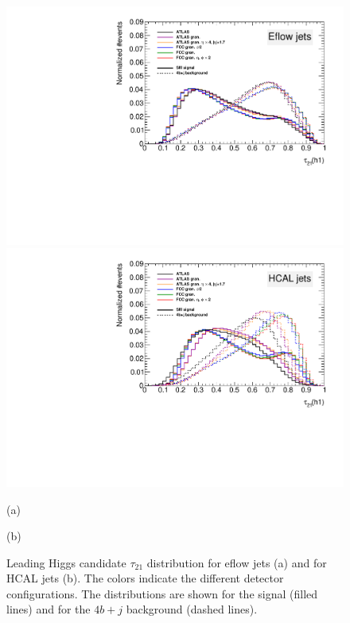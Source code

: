\begin{figure}
	\centering
	\begin{minipage}[t]{.5\textwidth}
		\centering
		\includegraphics[trim={.65cm 0 0 0},clip,width=\linewidth]{./Figures/tau21.pdf}
	\end{minipage}%
	\begin{minipage}[t]{.5\textwidth}
		\centering
		\includegraphics[trim={0 0 .65cm 0},clip,width=\linewidth]{./Figures/tau21CALO.pdf}
	\end{minipage}
	
	\begin{minipage}[t]{0.5\textwidth}
		\caption*{(a)}
	\end{minipage}%
	\hfill
	\begin{minipage}[t]{0.5\textwidth}
		\caption*{(b)}
	\end{minipage}
	\caption{Leading Higgs candidate $\tau_{21}$ distribution for eflow jets (a) and for HCAL jets (b). The colors indicate the different detector configurations. The distributions are shown for the signal (filled lines) and for the $4b+j$ background (dashed lines).}
	\label{fig:CompGran_sub}
\end{figure}

